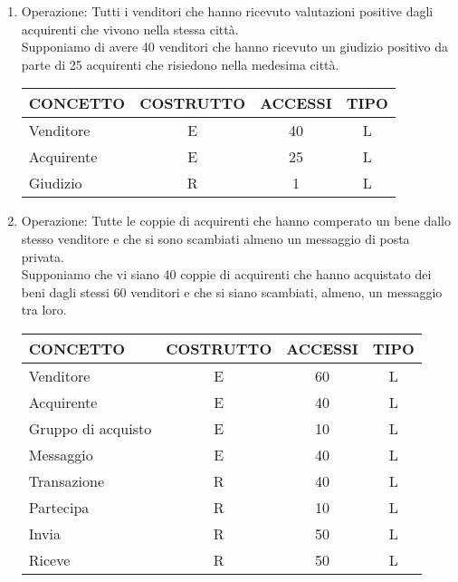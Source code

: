 \documentclass[a4paper, 10pt]{report}
\begin{document}
\begin{enumerate}
\item Operazione: Tutti i venditori che hanno ricevuto valutazioni positive dagli acquirenti che vivono nella stessa citt\`a.\\
Supponiamo di avere 40 venditori che hanno ricevuto un giudizio positivo da parte di 25 acquirenti che risiedono nella medesima citt\`a.
\begin{table}[h!]
\centering
\begin{tabular}{|l|c|c|c|}
\hline
\textbf{CONCETTO}&\textbf{COSTRUTTO}&\textbf{ACCESSI}&\textbf{TIPO}\\
\hline
Venditore & E & 40 & L\\
\hline
Acquirente & E & 25 & L\\
\hline
Giudizio & R & 1 & L\\
\hline
\end{tabular}
\end{table}

\item Operazione: Tutte le coppie di acquirenti che hanno comperato un bene dallo stesso venditore e che si sono scambiati almeno un messaggio di posta privata.\\
Supponiamo che vi siano 40 coppie di acquirenti che hanno acquistato dei beni dagli stessi 60 venditori e che si siano scambiati, almeno, un messaggio tra loro.
\begin{table}[h!]
\centering
\begin{tabular}{|l|c|c|c|}
\hline
\textbf{CONCETTO}&\textbf{COSTRUTTO}&\textbf{ACCESSI}&\textbf{TIPO}\\
\hline
Venditore & E & 60 & L\\ 
\hline
Acquirente & E & 40 & L\\
\hline
Gruppo di acquisto & E & 10 & L\\
\hline
Messaggio & E & 40 & L\\
\hline
Transazione & R & 40 & L\\
\hline
Partecipa & R & 10 & L\\
\hline
Invia & R & 50 & L\\
\hline
Riceve & R & 50 & L\\
\hline
\end{tabular}
\end{table}


\end{enumerate}
\end{document}
